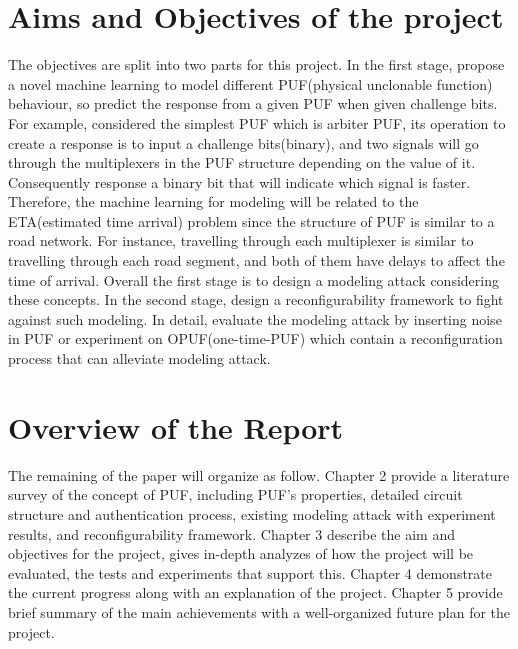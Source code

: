 \section{Aims and Objectives of the project}
The objectives are split into two parts for this project. In the first stage, propose a novel machine learning to model different PUF(physical unclonable function)
behaviour, so predict the response from a given PUF when given challenge bits. For example, considered the simplest PUF which is arbiter PUF, its operation to create a response is to
input a challenge bits(binary), and two signals will go through the multiplexers in the PUF structure depending on the value of it. Consequently response a binary bit
that will indicate which signal is faster. Therefore, the machine learning for modeling will be related to the ETA(estimated time arrival) problem since the structure of PUF is similar to a road network. 
For instance, travelling through each multiplexer is similar to travelling through each road segment, and both of them have delays to affect the time of arrival. Overall the first stage is to design a modeling attack
considering these concepts. In the second stage, design a reconfigurability framework to fight against such modeling. In detail, evaluate the modeling attack by inserting noise in PUF or experiment on OPUF(one-time-PUF) which
contain a reconfiguration process that can alleviate modeling attack.

\section{Overview of the Report}
The remaining of the paper will organize as follow. Chapter 2 provide a literature survey of the concept of PUF, including PUF's properties, detailed circuit structure and authentication process, 
existing modeling attack with experiment results, and reconfigurability framework. Chapter 3 describe the aim and objectives for the project, gives in-depth analyzes of how the project will be evaluated, 
the tests and experiments that support this. Chapter 4 demonstrate the current progress along with an explanation of the project. Chapter 5 provide brief summary of the main achievements with a well-organized future plan for the project.

